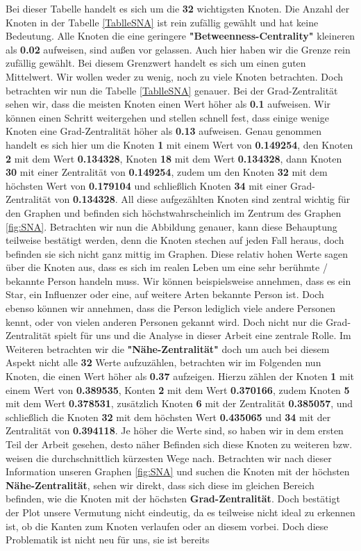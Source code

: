 Bei dieser Tabelle handelt es sich um die \textbf{32} wichtigsten Knoten. Die Anzahl der Knoten in der Tabelle \ref{TablleSNA} ist rein zufällig gewählt und hat keine Bedeutung. Alle Knoten die eine geringere \textbf{"Betweenness-Centrality"} kleineren als \textbf{0.02} aufweisen, sind außen vor gelassen. Auch hier haben wir die Grenze rein zufällig gewählt. Bei diesem Grenzwert handelt es sich um einen guten Mittelwert. Wir wollen weder zu wenig, noch zu viele Knoten betrachten. Doch betrachten wir nun die Tabelle \ref{TablleSNA} genauer. 
Bei der Grad-Zentralität sehen wir, dass die meisten Knoten einen Wert höher als \textbf{0.1} aufweisen. Wir können einen Schritt weitergehen und stellen schnell fest, dass einige wenige Knoten eine Grad-Zentralität höher als \textbf{0.13} aufweisen. Genau genommen handelt es sich hier um die Knoten \textbf{1} mit einem Wert von \textbf{0.149254}, den Knoten \textbf{2} mit dem Wert \textbf{0.134328}, Knoten \textbf{18} mit dem Wert \textbf{0.134328}, dann Knoten \textbf{30} mit einer Zentralität von \textbf{0.149254}, zudem um den Knoten \textbf{32} mit dem höchsten Wert von \textbf{0.179104} und schließlich Knoten \textbf{34} mit einer Grad-Zentralität von \textbf{0.134328}. All diese aufgezählten Knoten sind zentral wichtig für den Graphen und befinden sich höchstwahrscheinlich im Zentrum des Graphen \ref{fig:SNA}. Betrachten wir nun die Abbildung genauer, kann diese Behauptung teilweise bestätigt werden, denn die Knoten stechen auf jeden Fall heraus, doch befinden sie sich nicht ganz mittig im Graphen.  Diese relativ hohen Werte sagen über die Knoten aus, dass es sich im realen Leben um eine sehr berühmte / bekannte Person handeln muss. Wir können beispielsweise annehmen, dass es ein Star, ein Influenzer oder eine, auf weitere Arten bekannte Person ist. Doch ebenso können wir annehmen, dass die Person lediglich viele andere Personen kennt, oder von vielen anderen Personen gekannt wird. Doch nicht nur die Grad-Zentralität spielt für uns und die Analyse in dieser Arbeit eine zentrale Rolle. Im Weiteren betrachten wir die \textbf{"Nähe-Zentralität"} doch um auch bei diesem Aspekt nicht alle \textbf{32} Werte aufzuzählen, betrachten wir im Folgenden nun Knoten, die einen Wert höher als \textbf{0.37} aufzeigen. Hierzu zählen der Knoten \textbf{1} mit einem Wert von \textbf{0.389535}, Konten \textbf{2} mit dem Wert \textbf{0.370166}, zudem Knoten \textbf{5} mit dem Wert \textbf{0.378531}, zusätzlich Knoten \textbf{6} mit der Zentralität \textbf{0.385057}, und schließlich die Knoten \textbf{32} mit dem höchsten Wert \textbf{0.435065} und \textbf{34} mit der Zentralität von \textbf{0.394118}. Je höher die Werte sind, so haben wir in dem ersten Teil der Arbeit gesehen, desto näher Befinden sich diese Knoten zu weiteren bzw. weisen die durchschnittlich kürzesten Wege nach. Betrachten wir nach dieser Information unseren Graphen \ref{fig:SNA} und suchen die Knoten mit der höchsten \textbf{Nähe-Zentralität}, sehen wir direkt, dass sich diese im gleichen Bereich befinden, wie die Knoten mit der höchsten \textbf{Grad-Zentralität}. Doch bestätigt der Plot unsere Vermutung nicht eindeutig, da es teilweise nicht ideal zu erkennen ist, ob die Kanten zum Knoten verlaufen oder an diesem vorbei. Doch diese Problematik ist nicht neu für uns, sie ist bereits 